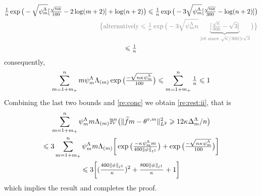 \begin{pro}
\begin{multline*}
\tfrac{1}{\ssY}\exp\big(-\sqrt{\cmSv}[\tfrac{\sqrt{\ssY\cpen}}{100}-2\log(\Di+2)]+\log(\ssY+2)\big)
\leq\tfrac{1}{\ssY}\exp\big(-3\sqrt{\cmSv}[\tfrac{\sqrt{\ssY\cpen}}{300}-\log(\ssY+2)]\big)
\\\hfill\dgrau\big\{\text{alternatively}\leq
\tfrac{1}{\ssY}\exp\big(-3\sqrt{\cmSv\ssY}\underbrace{[\tfrac{\sqrt{\cpen}}{300}-\sqrt{3}]}_{\geq0\text{
    since } \sqrt{\cpen}/300\geq\sqrt{3}}\big)\big\}\\
\leq \tfrac{1}{\ssY}
  \end{multline*}
consequently, 
\begin{equation*}
\sum_{m=1+m_{+}}^{n}m\psi_{m}^{\Lambda_{}}\Lambda_{(m)}\exp\big(\tfrac{-\sqrt{n\kappa_{}\psi_{m}^{\Lambda_{}}}}{100}\big)\leqslant\sum_{m=1+m_{+}}^{n}\tfrac{1}{n}\leqslant1
\end{equation*}
Combining the last two bounds and \cref{re:conc} we obtain \ref{re:rest:ii}, that is 
\begin{multline*}
\sum_{\Di=1+\pDi}^{\ssY}\cmiSv \Di \miSv\FuVg[\ssY]{\rY}\big(\VnormLp{\txdfPr[\Di]-\xdfPr[\Di]}^2\geq\penSv\big)\\\hfill\leq 3\sum_{\Di=1+\pDi}^{\ssY}\cmiSv \Di \miSv\bigg[\exp\big(\tfrac{-\cpen\cmSv\Di}{400\Vnormlp[1]{\fydf}}\big)+\exp\big(\tfrac{-\sqrt{n\cpen\cmSv}}{100}\big)
\bigg]\\
\leq3\bigg[
(\tfrac{400\Vnormlp[1]{\fydf}}{\cpen})^2+\tfrac{800\Vnormlp[1]{\fydf}}{\cpen}
+ 1\bigg]
\end{multline*}
which implies the result and completes the proof.\proEnd\end{pro}

